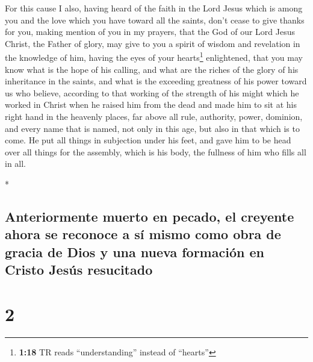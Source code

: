 \begin{paracol}{2}
\begin{otherlanguage}{english}
 For this cause I also, having heard of the faith in the
Lord Jesus which is among you and the love which you have toward all the
saints,  don't cease to give thanks for you, making
mention of you in my prayers,  that the God of our Lord
Jesus Christ, the Father of glory, may give to you a spirit of wisdom
and revelation in the knowledge of him,  having the eyes
of your hearts\footnote{\textbf{1:18} TR reads ``understanding'' instead
  of ``hearts''} enlightened, that you may know what is the hope of his
calling, and what are the riches of the glory of his inheritance in the
saints,  and what is the exceeding greatness of his power
toward us who believe, according to that working of the strength of his
might  which he worked in Christ when he raised him from
the dead and made him to sit at his right hand in the heavenly places,
 far above all rule, authority, power, dominion, and
every name that is named, not only in this age, but also in that which
is to come.  He put all things in subjection under his
feet, and gave him to be head over all things for the assembly,
 which is his body, the fullness of him who fills all in
all.

\end{otherlanguage}

\switchcolumn[0]*

\hypertarget{anteriormente-muerto-en-pecado-el-creyente-ahora-se-reconoce-a-suxed-mismo-como-obra-de-gracia-de-dios-y-una-nueva-formaciuxf3n-en-cristo-jesuxfas-resucitado}{%
\subsection{Anteriormente muerto en pecado, el creyente ahora se
reconoce a sí mismo como obra de gracia de Dios y una nueva formación en
Cristo Jesús
resucitado}\label{anteriormente-muerto-en-pecado-el-creyente-ahora-se-reconoce-a-suxed-mismo-como-obra-de-gracia-de-dios-y-una-nueva-formaciuxf3n-en-cristo-jesuxfas-resucitado}}

\hypertarget{section-2}{%
\section{2}\label{section-2}}


\end{paracol}
